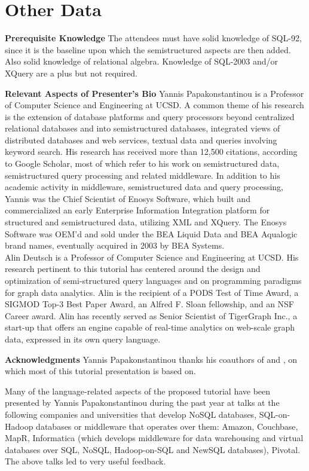 

\section{Other Data}
\label{sec:duration}

\noindent \textbf{Prerequisite Knowledge} 
\label{sec:audience}
The attendees must have solid knowledge of SQL-92, since it is the baseline upon which the semistructured aspects are then added. Also solid knowledge of relational algebra. Knowledge of SQL-2003 and/or XQuery are a plus but not required.

\noindent \textbf{Relevant Aspects of Presenter's Bio} 
Yannis Papakonstantinou is a Professor of Computer Science and Engineering at UCSD. A common theme of his research is the extension of database platforms and query processors beyond centralized relational databases and into semistructured databases, integrated views of distributed databases and web services, textual data and queries involving keyword search. His research has received more than 12,500 citations, according to Google Scholar, most of which refer to his work on semistructured data, semistructured query processing and related middleware.
In addition to his academic activity in middleware, semistructured data and query processing, Yannis was the Chief Scientist of Enosys Software, which built and commercialized an early Enterprise Information Integration platform for structured and semistructured data, utilizing XML and XQuery. The Enosys Software was OEM'd and sold under the BEA Liquid Data and BEA Aqualogic brand names, eventually acquired in 2003 by BEA Systems.\\

Alin Deutsch is a Professor of Computer Science and Engineering at UCSD. His research pertinent to this tutorial has centered around the design and optimization of semi-structured query languages
and on programming paradigms for graph data analytics. Alin is the recipient of a PODS Test of Time Award, a SIGMOD Top-3 Best Paper Award, an Alfred F. Sloan fellowship, and an NSF Career award.
Alin has recently served as Senior Scientist of TigerGraph Inc., a start-up that offers an engine capable of real-time analytics on web-scale graph data, expressed in its own query language.


\noindent \textbf{Acknowledgments} 
Yannis Papakonstantinou thanks his coauthors of \cite{sqlpp-extended-corr-2015} and \cite{sqlpp-survey-2015}, on which most of this tutorial presentation is based on.

Many of the language-related aspects of the proposed tutorial have been presented by Yannis Papakonstantinou during the past year at talks at the following companies and universities that develop NoSQL databases,  SQL-on-Hadoop databases or middleware that operates over them: Amazon, Couchbase, MapR, Informatica (which develops middleware for data warehousing and virtual databases over SQL, NoSQL, Hadoop-on-SQL and NewSQL databases), Pivotal. The above talks led to very useful feedback.
